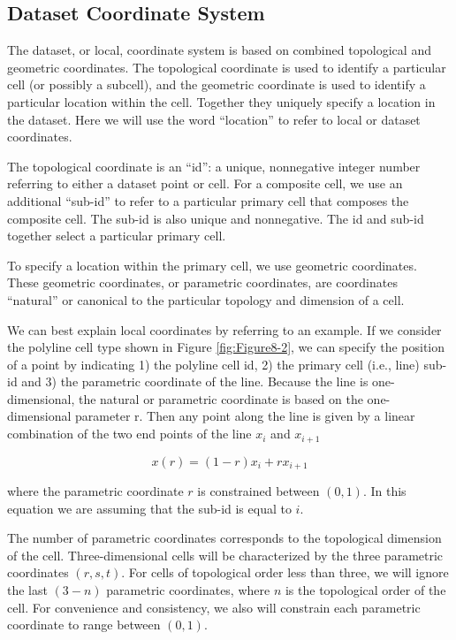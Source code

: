 \subsection{Dataset Coordinate System}

The dataset, or local, coordinate system is based on combined topological and geometric coordinates. The topological coordinate is used to identify a particular cell (or possibly a subcell), and the geometric coordinate is used to identify a particular location within the cell. Together they uniquely specify a location in the dataset. Here we will use the word ``location'' to refer to local or dataset coordinates.

The topological coordinate is an ``id'': a unique, nonnegative integer number referring to either a dataset point or cell. For a composite cell, we use an additional “sub-id” to refer to a particular primary cell that composes the composite cell. The sub-id is also unique and nonnegative. The id and sub-id together select a particular primary cell.

To specify a location within the primary cell, we use geometric coordinates. These geometric coordinates, or parametric coordinates, are coordinates ``natural'' or canonical to the particular topology and dimension of a cell.

We can best explain local coordinates by referring to an example. If we consider the polyline cell type shown in Figure \ref{fig:Figure8-2}, we can specify the position of a point by indicating 1) the polyline cell id, 2) the primary cell (i.e., line) sub-id and 3) the parametric coordinate of the line. Because the line is one-dimensional, the natural or parametric coordinate is based on the one-dimensional parameter r. Then any point along the line is given by a linear combination of the two end points of the line $x_i$ and $x_{i+1}$

\begin{equation}\label{eq:8.1}
x(r) = (1 - r) x_i + r x_{i + 1}
\end{equation}

where the parametric coordinate $r$ is constrained between $(0,1)$. In this equation we are assuming that the sub-id is equal to $i$.

The number of parametric coordinates corresponds to the topological dimension of the cell. Three-dimensional cells will be characterized by the three parametric coordinates $(r, s, t)$. For cells of topological order less than three, we will ignore the last $(3 - n)$ parametric coordinates, where $n$ is the topological order of the cell. For convenience and consistency, we also will constrain each parametric coordinate to range between $(0,1)$.

